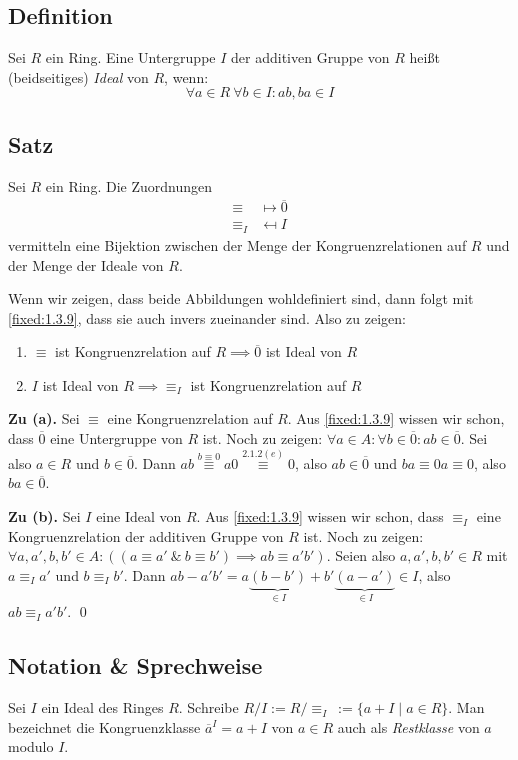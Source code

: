 \subsection{Definition} Sei $R$ ein Ring. Eine Untergruppe $I$ der additiven Gruppe von $R$ heißt (beidseitiges) \emph{Ideal} von $R$, wenn:
\begin{equation*}
	\forall a\in R ~\forall b \in I : ab, ba \in I
\end{equation*}
 
\subsection{Satz} \ALref{\ref{fixed:1.3.9}}  Sei $R$ ein Ring. Die Zuordnungen
\begin{align*}
	\equiv&\mapsto\overline0\\
	\equiv_I&\mapsfrom I
\end{align*}
vermitteln eine Bijektion zwischen der Menge der Kongruenzrelationen auf $R$ und der Menge der Ideale von $R$.
 
\proof Wenn wir zeigen, dass beide Abbildungen wohldefiniert sind, dann folgt mit \ref{fixed:1.3.9}, dass sie auch invers zueinander sind. Also zu zeigen:
\begin{enumerate}[label=(\alph*)]
	\item $\equiv$ ist Kongruenzrelation auf $R \implies \overline 0$ ist Ideal von $R$
	\item $I$ ist Ideal von $R \implies \equiv_I$ ist Kongruenzrelation auf $R$
\end{enumerate}

{\bf Zu (a).} Sei $\equiv$ eine Kongruenzrelation auf $R$. Aus \ref{fixed:1.3.9} wissen wir schon, dass $\overline 0$ eine Untergruppe von $R$ ist. Noch zu zeigen: $\forall a\in A:\forall b\in\overline0:ab\in\overline0$. Sei also $a\in R$ und $b\in\overline 0$. Dann $ab \overset{b \equiv 0} \equiv a0 \overset{2.1.2(e)}\equiv0$, also $ab\in\overline0$ und $ba\equiv0a\equiv0$, also $ba\in\overline0$.
 
{\bf Zu (b).} Sei $I$ eine Ideal von $R$. Aus \ref{fixed:1.3.9} wissen wir schon, dass $\equiv_I$ eine Kongruenzrelation der additiven Gruppe von $R$ ist. Noch zu zeigen: $\forall a,a',b,b'\in A:((a\equiv a' ~\&~ b\equiv b')\implies ab\equiv a'b')$. Seien also $a,a',b,b'\in R$ mit $a\equiv_Ia'$ und $b\equiv_Ib'$. Dann $ab-a'b'=a\underbrace{(b-b')}_{\in I} + b'\underbrace{(a-a')}_{\in I}\in I$, also $ab\equiv_Ia'b'$. \qed

\subsection{Notation \& Sprechweise} Sei $I$ ein Ideal des Ringes $R$. Schreibe $R/I := R/\equiv_I ~:= \{ a+I \mid a \in R \}$. Man bezeichnet die Kongruenzklasse $\overline{a}^I = a+I$ von $a\in R$ auch als \emph{Restklasse} von $a$ modulo $I$.
 
